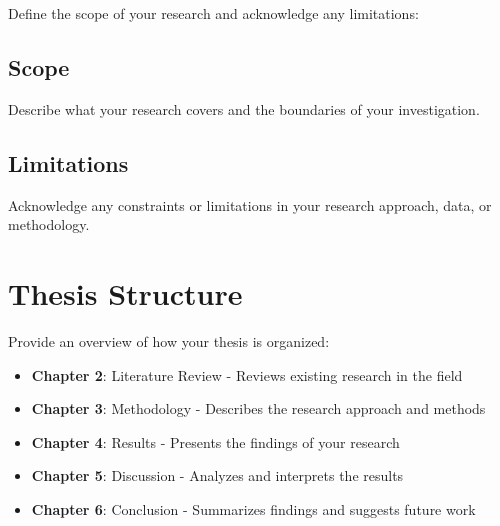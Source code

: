Define the scope of your research and acknowledge any limitations:

\subsection{Scope}
Describe what your research covers and the boundaries of your investigation.

\subsection{Limitations}
Acknowledge any constraints or limitations in your research approach, data, or methodology.

\section{Thesis Structure}

Provide an overview of how your thesis is organized:

\begin{itemize}
    \item \textbf{Chapter 2}: Literature Review - Reviews existing research in the field
    \item \textbf{Chapter 3}: Methodology - Describes the research approach and methods
    \item \textbf{Chapter 4}: Results - Presents the findings of your research
    \item \textbf{Chapter 5}: Discussion - Analyzes and interprets the results
    \item \textbf{Chapter 6}: Conclusion - Summarizes findings and suggests future work
\end{itemize}